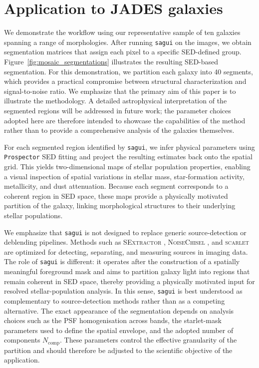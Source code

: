 \documentclass[fleqn,usenatbib]{mnras}
\begin{document}
\section{Application to JADES galaxies}
\label{sec:results}

We demonstrate the workflow using our representative sample of ten galaxies spanning a range of morphologies. After running \texttt{sagui} on the images, we obtain segmentation matrices that assign each pixel to a specific SED-defined group. Figure~\ref{fig:mosaic_segmentations} illustrates the resulting SED-based segmentation. For this demonstration, we partition each galaxy into 40 segments, which provides a practical compromise between structural characterization and signal-to-noise ratio. We emphasize that the primary aim of this paper is to illustrate the methodology. A detailed astrophysical interpretation of the segmented regions will be addressed in future work; the parameter choices adopted here are therefore intended to showcase the capabilities of the method rather than to provide a comprehensive analysis of the galaxies themselves.


For each segmented region identified by \texttt{sagui}, we infer physical parameters using \texttt{Prospector} SED fitting and project the resulting estimates back onto the spatial grid. This yields two-dimensional maps of stellar population properties,  enabling a visual inspection of spatial variations in stellar mass, star-formation activity, metallicity, and dust attenuation. Because each segment corresponds to a coherent region in SED space, these maps provide a physically motivated partition of the galaxy, linking morphological structures to their underlying stellar populations.

We emphasize that \texttt{sagui} is not designed to replace generic source-detection or deblending pipelines. Methods such as \textsc{SExtractor} \citep{Bertin1996}, \textsc{NoiseChisel} \citep{Akhlaghi2015}, and \textsc{scarlet} \citep{Melchior2018} are optimized for detecting, separating, and measuring sources in imaging data. The role of \texttt{sagui} is different: it operates after the construction of a spatially meaningful foreground mask and aims to partition galaxy light into regions that remain coherent in SED space, thereby providing a physically motivated input for resolved stellar-population analysis. In this sense, \texttt{sagui} is best understood as complementary to source-detection methods rather than as a competing alternative. The exact appearance of the segmentation depends on analysis choices such as the PSF homogenisation across bands, the starlet-mask parameters used to define the spatial envelope, and the adopted number of components $N_{\mathrm{comp}}$. These parameters control the effective granularity of the partition and should therefore be adjusted to the scientific objective of the application.
\end{document}
